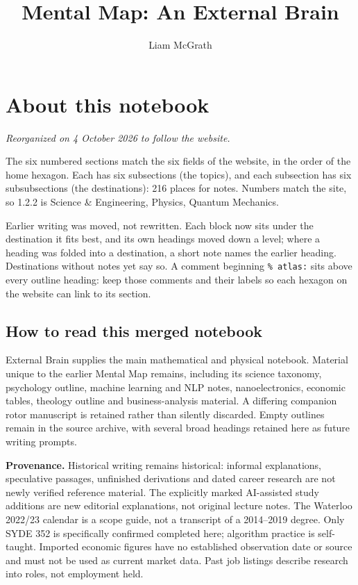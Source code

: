 \documentclass{article}
\title{Mental Map: An External Brain}
\author{Liam McGrath}
\begin{document}
\maketitle
\tableofcontents

\section*{About this notebook}\label{about-this-notebook}
\textit{Reorganized on 4 October 2026 to follow the website.}

The six numbered sections match the six fields of the website, in the order of the home hexagon. Each has six subsections (the topics), and each subsection has six subsubsections (the destinations): 216 places for notes. Numbers match the site, so 1.2.2 is Science \& Engineering, Physics, Quantum Mechanics.

Earlier writing was moved, not rewritten. Each block now sits under the destination it fits best, and its own headings moved down a level; where a heading was folded into a destination, a short note names the earlier heading. Destinations without notes yet say so. A comment beginning \texttt{\% atlas:} sits above every outline heading: keep those comments and their labels so each hexagon on the website can link to its section.

\subsection*{How to read this merged notebook}
External Brain supplies the main mathematical and physical notebook. Material unique to the earlier Mental Map remains, including its science taxonomy, psychology outline, machine learning and NLP notes, nanoelectronics, economic tables, theology outline and business-analysis material. A differing companion rotor manuscript is retained rather than silently discarded. Empty outlines remain in the source archive, with several broad headings retained here as future writing prompts.

\textbf{Provenance.} Historical writing remains historical: informal explanations, speculative passages, unfinished derivations and dated career research are not newly verified reference material. The explicitly marked AI-assisted study additions are new editorial explanations, not original lecture notes. The Waterloo 2022/23 calendar is a scope guide, not a transcript of a 2014--2019 degree. Only SYDE 352 is specifically confirmed completed here; algorithm practice is self-taught. Imported economic figures have no established observation date or source and must not be used as current market data. Past job listings describe research into roles, not employment held.
\end{document}
